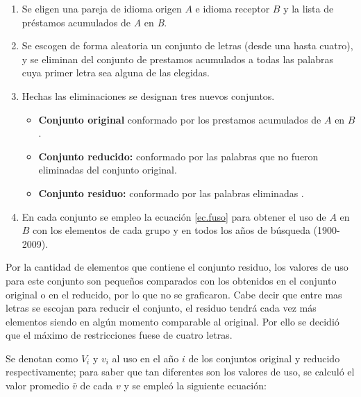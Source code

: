 \begin{enumerate}
	
	\item Se eligen una pareja de idioma origen $\textit{A}$ e idioma receptor $\textit{B}$ y la lista de préstamos acumulados de \textit{A} en \textit{B}.
	
	\item Se escogen de forma aleatoria un conjunto de letras (desde una hasta cuatro), y se eliminan del conjunto de prestamos acumulados  a todas las palabras cuya primer letra sea alguna de las elegidas.  
	
	\newpage
	
	\item Hechas las eliminaciones se designan tres nuevos conjuntos. 
	
		\begin{itemize}
			\item \textbf{Conjunto original} conformado por los prestamos acumulados  de $\textit{A}$  en $\textit{B}$.
			\item \textbf{Conjunto reducido:} conformado por las palabras que no fueron eliminadas del conjunto original. 
			\item \textbf{Conjunto residuo:} conformado por las palabras eliminadas . 
		\end{itemize}
	
	\item En cada conjunto se empleo la ecuación \ref{ec.fuso} para obtener el uso de $\textit{A}$ en $\textit{B}$  con los elementos de cada grupo y en todos los años de búsqueda (1900-2009).
	
	 
	
\end{enumerate}


Por la cantidad de elementos que contiene el conjunto residuo, los valores de uso para este conjunto son pequeños comparados con los obtenidos en el conjunto original o en el reducido, por lo que no se graficaron. Cabe decir que entre mas letras se escojan para reducir el conjunto, el residuo tendrá cada vez más elementos siendo en algún momento comparable al original.  Por ello se decidió que el máximo de restricciones fuese de cuatro letras. 

Se denotan como $V_{i}$ y $v_{i}$ al uso en el año $i$ de los conjuntos original y reducido respectivamente; para saber que tan diferentes son los valores de uso, se calculó el valor promedio $\bar{v}$ de cada $v$  y  se empleó la siguiente ecuación:

